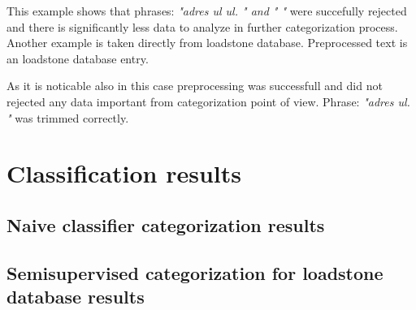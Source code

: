 \begin{algorithm}[h]
\end{algorithm}
This example shows that phrases: \textit{"adres ul ul. " and " "} were succefully rejected and there is significantly less data to analyze in further categorization process.
\newline
Another example is taken directly from loadstone database. Preprocessed text is an loadstone database entry.
\begin{algorithm}[h]
\end{algorithm}
As it is noticable also in this case preprocessing was successfull and did not rejected any data important from categorization point of view. Phrase: \textit{"adres ul. "} was trimmed correctly.
 
  
\section{Classification results}

\subsection{Naive classifier categorization results}
\subsection{Semisupervised categorization for loadstone database results}